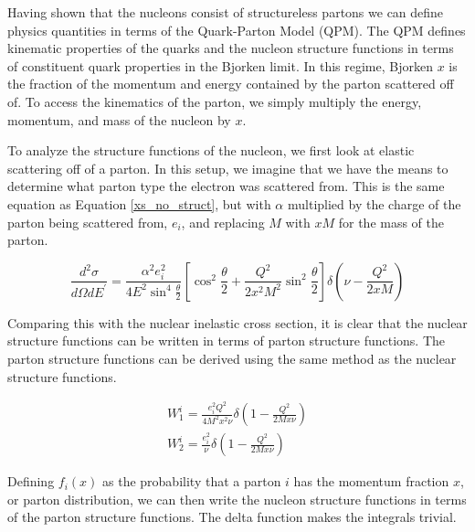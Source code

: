 
Having shown that the nucleons consist of structureless partons we can define physics quantities in terms of the Quark-Parton Model (QPM). The QPM defines kinematic properties of the quarks and the nucleon structure functions in terms of constituent quark properties in the Bjorken limit. In this regime, Bjorken $x$ is the fraction of the momentum and energy contained by the parton scattered off of. To access the kinematics of the parton, we simply multiply the energy, momentum, and mass of the nucleon by $x$.

To analyze the structure functions of the nucleon, we first look at elastic scattering off of a parton. In this setup, we imagine that we have the means to determine what parton type the electron was scattered from. This is the same equation as Equation \ref{xs_no_struct}, but with $\alpha$ multiplied by the charge of the parton being scattered from, $e_i$, and replacing $M$ with $xM$ for the mass of the parton.

\begin{equation}
	\frac{d^2\sigma}{d\Omega dE^\prime} = \frac{\alpha^{2}e_{i}^{2}}{4E^{2}\sin^{4}\frac{\theta}{2}} \left[\cos^{2}\frac{\theta}{2} + \frac{Q^2}{2x^2M^2}\sin^{2}\frac{\theta}{2}\right] \delta\left(\nu-\frac{Q^2}{2xM}\right)
\end{equation}

Comparing this with the nuclear inelastic cross section, it is clear that the nuclear structure functions can be written in terms of parton structure functions. The parton structure functions can be derived using the same method as the nuclear structure functions.

\begin{subequations}
\begin{align}
	W_1^i = \frac{e_{i}^{2}Q^2}{4M^{2}x^{2}\nu}\delta\left(1-\frac{Q^2}{2Mx\nu}\right) \\
	W_2^i = \frac{e_{i}^{2}}{\nu}\delta\left(1-\frac{Q^2}{2Mx\nu}\right)
\end{align}
\end{subequations}

Defining $f_{i}\left(x\right)$ as the probability that a parton $i$ has the momentum fraction $x$, or parton distribution, we can then write the nucleon structure functions in terms of the parton structure functions. The delta function makes the integrals trivial.

